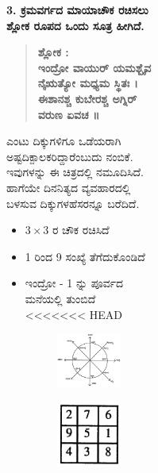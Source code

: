 \begin{figure}[H]
\begin{figure}[H]
\begin{figure}[h]
\begin{figure}[h]
\textbf{3. ಕ್ರಮವರ್ಗದ ಮಾಯಾಚೌಕ ರಚಿಸಲು ಶ್ಲೋಕ ರೂಪದ ಒಂದು ಸೂತ್ರ ಹೀಗಿದೆ.}
\begin{quote}
\textbf{ಶ್ಲೋಕ :}\\
\textbf{ಇಂದ್ರೋ ವಾಯುರ್ ಯಮಶ್ಬೈವ ನೈಋತ್ಯೋ ಮಧ್ಯಮ ಸ್ಥಿತಃ ।}\\
\textbf{ಈಶಾನಶ್ಚ ಕುಬೇರಶ್ಚ ಅಗ್ನಿರ್ ವರುಣ ಏವಚ ॥}
\end{quote}
ಎಂಟು ದಿಕ್ಕುಗಳಿಗೂ ಒಡೆಯರಾಗಿ ಅಷ್ಟದಿಕ್ಪಾಲಕರಿದ್ದಾರೆಂಬುದು ನಂಬಿಕೆ. ಇವುಗಳನ್ನು ಈ ಚಿತ್ರದಲ್ಲಿ ನಮೂದಿಸಿದೆ. ಹಾಗೆಯೇ ದಿನನಿತ್ಯದ ವ್ಯವಹಾರದಲ್ಲಿ ಬಳಸುವ ದಿಕ್ಕುಗಳ\break ಹೆಸರನ್ನೂ ಬರೆದಿದೆ.
\begin{itemize}
	\item $3 \times 3$ ರ ಚೌಕ ರಚಿಸಿದೆ
	\item 1 ರಿಂದ 9 ಸಂಖ್ಯೆ ತೆಗೆದುಕೊಂಡಿದೆ
	\item ಇಂದ್ರೋ - 1 ನ್ನು ಪೂರ್ವದ ಮನೆಯಲ್ಲಿ ತುಂಬಿದೆ
<<<<<<< HEAD
	\begin{figure}[h]
	\includegraphics{src/figures/chap3/fig3-38.jpg}
	\end{figure}
	\begin{figure}[h]
	\includegraphics{src/figures/chap3/fig3-39.jpg}

\end{figure}
\end{itemize}
\end{figure}
\end{figure}
\end{figure}
\end{figure}
